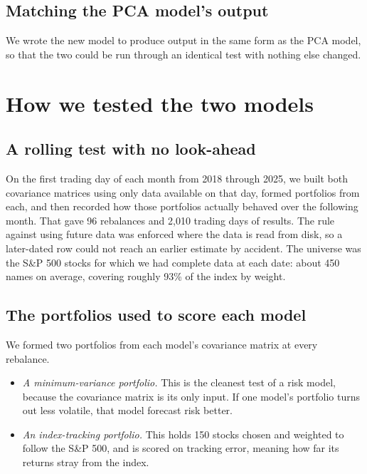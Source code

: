 \documentclass[11pt,letterpaper]{article}
\begin{document}
\subsection{Matching the PCA model's output}

We wrote the new model to produce output in the same form as the PCA model, so that the two
could be run through an identical test with nothing else changed.

\section{How we tested the two models}

\subsection{A rolling test with no look-ahead}

On the first trading day of each month from
2018 through 2025, we built both covariance matrices using only data available on that day,
formed portfolios from each, and then recorded how those portfolios actually behaved over
the following month. That gave 96 rebalances and 2,010 trading days of results. The rule
against using future data was enforced where the data is read from disk, so a later-dated
row could not reach an earlier estimate by accident. The universe was the S\&P 500 stocks
for which we had complete data at each date: about 450 names on average, covering roughly
93\% of the index by weight.

\subsection{The portfolios used to score each model}

We formed two portfolios from each model's covariance matrix at every rebalance.
\begin{itemize}
\item \emph{A minimum-variance portfolio.} This is the cleanest test of a risk model,
because the covariance matrix is its only input. If one model's portfolio turns out less
volatile, that model forecast risk better.
\item \emph{An index-tracking portfolio.} This holds 150 stocks chosen and weighted to
follow the S\&P 500, and is scored on tracking error, meaning how far its returns stray from
the index.
\end{itemize}
\end{document}
